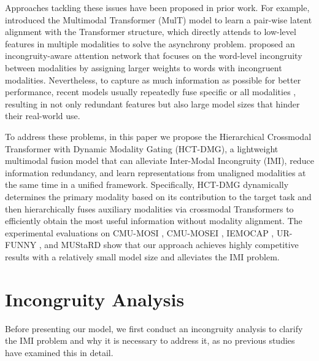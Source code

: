 \documentclass[11pt,a4paper]{article}
\begin{document}
Approaches tackling these issues have been proposed in prior work. For example, \citet{Tsai2019} introduced the Multimodal Transformer (MulT) model to learn a pair-wise latent alignment with the Transformer structure, which directly attends to low-level features in multiple modalities to solve the asynchrony problem. \citet{Wu2021} proposed an incongruity-aware attention network that focuses on the word-level incongruity between modalities by assigning larger weights to words with incongruent modalities. Nevertheless, to capture as much information as possible for better performance, recent models usually repeatedly fuse specific or all modalities \citep{liang2018multimodal}, resulting in not only redundant features but also large model sizes that hinder their real-world use.

To address these problems, in this paper we propose the Hierarchical Crossmodal Transformer with Dynamic Modality Gating (HCT-DMG), a lightweight multimodal fusion model that can alleviate Inter-Modal Incongruity (IMI), reduce information redundancy, and learn representations from unaligned modalities at the same time in a unified framework. Specifically, HCT-DMG dynamically determines the primary modality based on its contribution to the target task and then hierarchically fuses auxiliary modalities via crossmodal Transformers to efficiently obtain the most useful information without modality alignment. The experimental evaluations on CMU-MOSI \citep{Zadeh2016}, CMU-MOSEI \citep{Zadeh2018}, IEMOCAP \citep{Busso2008}, UR-FUNNY \citep{hasan2019ur}, and MUStaRD \citep{castro2019towards} show that our approach achieves highly competitive results with a relatively small model size and alleviates the IMI problem.


\section{Incongruity Analysis}
\label{sec:analysis}
Before presenting our model, we first conduct an incongruity analysis to clarify the IMI problem and why it is necessary to address it, as no previous studies have examined this in detail.
\end{document}
